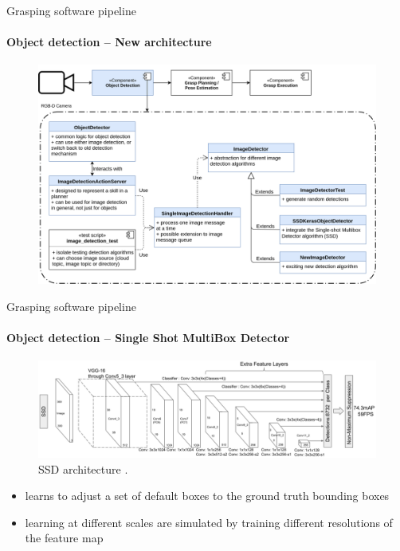 \documentclass{beamer}
\begin{document}
\begin{frame}{Grasping software pipeline}
\framesubtitle{Object detection -- New architecture}
    \begin{figure}[b]
        \centering
        \includegraphics[width=0.95\linewidth]{grasp_pipeline_new_perception}
    \end{figure}
\end{frame}

\begin{frame}{Grasping software pipeline}
    \framesubtitle{Object detection -- Single Shot MultiBox Detector}
    \begin{figure}[b]
        \centering
        \includegraphics[width=0.8\linewidth]{liu_et_al-2016-ssd_arch}
        \caption{SSD architecture \cite{Liu2016SSD}.}
        \label{fig:ssd_arch}
    \end{figure}
    \begin{itemize}
        \item learns to adjust a set of default boxes to the ground truth bounding boxes
        \item learning at different scales are simulated by training different resolutions of the feature map
    \end{itemize}
\end{frame}
\end{document}
